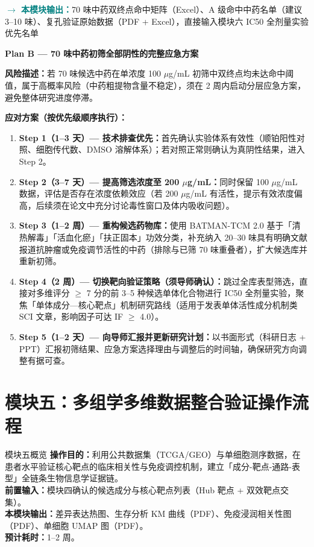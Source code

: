 \documentclass[12pt,a4paper,twoside]{article}
\newcommand{\moduleoutput}[1]{\par\vspace{6pt}\noindent\textcolor{teal}{\textbf{$\rightarrow$ 本模块输出：}}#1\vspace{6pt}}
\begin{document}
\moduleoutput{70 味中药双终点命中矩阵（Excel）、A 级命中中药名单（建议 3--10 味）、复孔验证原始数据（PDF + Excel），直接输入模块六 IC50 全剂量实验优先名单}

\begin{warningbox}
\textbf{Plan B --- 70 味中药初筛全部阴性的完整应急方案}

\textbf{风险描述：}若 70 味候选中药在单浓度 100 $\mu$g/mL 初筛中双终点均未达命中阈值，属于高概率风险（中药粗提物含量不稳定），须在 2 周内启动分层应急方案，避免整体研究进度停滞。

\textbf{应对方案（按优先级顺序执行）：}
\begin{enumerate}
  \item \textbf{Step 1（1--3 天）--- 技术排查优先：}首先确认实验体系有效性（顺铂阳性对照、细胞传代数、DMSO 溶解体系）；若对照正常则确认为真阴性结果，进入 Step 2。
  \item \textbf{Step 2（3--7 天）--- 提高筛选浓度至 200 $\mu$g/mL：}同时保留 100 $\mu$g/mL 数据，评估是否存在浓度依赖效应（若 200 $\mu$g/mL 有活性，提示有效浓度偏高，后续须在论文中充分讨论毒性窗口及体内吸收问题）。
  \item \textbf{Step 3（1--2 周）--- 重构候选药物库：}使用 BATMAN-TCM 2.0 基于「清热解毒」「活血化瘀」「扶正固本」功效分类，补充纳入 20--30 味具有明确文献报道抗肿瘤或免疫调节活性的中药（排除与已筛 70 味重叠者），扩大候选库并重新初筛。
  \item \textbf{Step 4（2 周）--- 切换靶向验证策略（须导师确认）：}跳过全库表型筛选，直接对多维评分 $\geq$ 7 分的前 3--5 种候选单体化合物进行 IC50 全剂量实验，聚焦「单体成分—核心靶点」机制研究路线（适用于发表单体活性成分机制类 SCI 文章，影响因子可达 IF $\geq$ 4.0）。
  \item \textbf{Step 5（1--2 天）--- 向导师汇报并更新研究计划：}以书面形式（科研日志 + PPT）汇报初筛结果、应急方案选择理由与调整后的时间轴，确保研究方向调整有据可查。
\end{enumerate}
\end{warningbox}

\section{模块五：多组学多维数据整合验证操作流程}
\label{sec:module5}

\begin{infobox}{模块五概览}
\textbf{操作目的：}利用公共数据集（TCGA/GEO）与单细胞测序数据，在患者水平验证核心靶点的临床相关性与免疫调控机制，建立「成分-靶点-通路-表型」全链条生物信息学证据链。\\
\textbf{前置输入：}模块四确认的候选成分与核心靶点列表（Hub 靶点 + 双效靶点交集）。\\
\textbf{本模块输出：}差异表达热图、生存分析 KM 曲线（PDF）、免疫浸润相关性图（PDF）、单细胞 UMAP 图（PDF）。\\
\textbf{预计耗时：}1--2 周。
\end{infobox}
\end{document}
